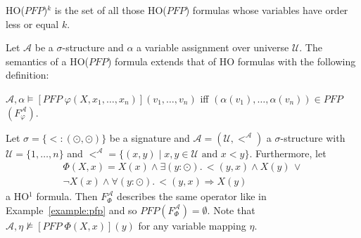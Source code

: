HO($\mathit{PFP}$)$^k$ is the set of all those HO($\mathit{PFP}$) formulas whose variables have order less or equal $k$.

\begin{definition}
    Let $\mathcal{A}$ be a $\sigma$-structure and $\alpha$ a variable assignment over universe $\mathcal{U}$. The
    semantics of a HO($\mathit{PFP}$) formula extends that of HO formulas with the following definition:
    \begin{compactitem}
        \item $\mathcal{A}, \alpha \models [\mathit{PFP}\;\varphi(X, x_1, \dots, x_n)](v_1, \dots,
        v_n)$ iff $(\alpha(v_1), \dots, \alpha(v_n)) \in \mathit{PFP}$ $(F_\varphi^\mathcal{A})$.
    \end{compactitem}
\end{definition}

\begin{example}
\label{example:ho_pfp}
Let $\sigma = \{ < : (\odot, \odot) \}$ be a signature and $\mathcal{A} = (\mathcal{U}, <^\mathcal{A})$ a $\sigma$-structure with $\mathcal{U} = \{1, \dots, n\}$ and $<^\mathcal{A} = \{(x, y) \mid x, y \in \mathcal{U} \text{ and } x < y\}$. Furthermore, let
\begin{align*}
	\Phi(X,x) = X(x) \wedge \exists (y \colon \odot).\, <(y, x) \wedge X(y)\,\vee \\ 
	\neg X(x) \wedge \forall (y \colon \odot).\, <(y, x) \Rightarrow X(y)
\end{align*}
a HO$^1$ formula. Then $F_\Phi^\mathcal{A}$ describes the same operator like in Example~\ref{example:pfp} and so $PFP(F_\Phi^\mathcal{A}) = \emptyset$. Note that $\mathcal{A}, \eta \not\models [PFP\; \Phi(X, x)](y)$ for any variable mapping $\eta$.
\end{example}